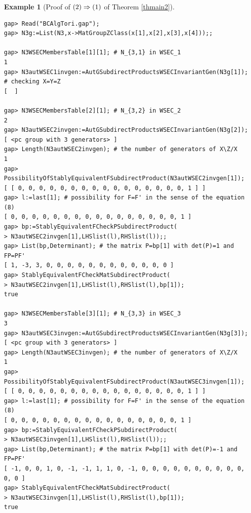 \documentclass{amsart}
\theoremstyle{plain}
\theoremstyle{definition}
\newtheorem{example}[theorem]{Example}
\theoremstyle{remark}
\newcounter{sub}\def\tr{\mbox{tr }}
\begin{document}
\bigskip
\begin{example}[Proof of ${\rm (2)}\Rightarrow {\rm (1)}$ of {Theorem \ref{thmain2}}]\label{ex9.1}~\vspace*{-5mm}\\
\begin{verbatim}
gap> Read("BCAlgTori.gap");
gap> N3g:=List(N3,x->MatGroupZClass(x[1],x[2],x[3],x[4]));;

gap> N3WSECMembersTable[1][1]; # N_{3,1} in WSEC_1
1
gap> N3autWSEC1invgen:=AutGSubdirectProductsWSECInvariantGen(N3g[1]); # checking X=Y=Z
[  ]

gap> N3WSECMembersTable[2][1]; # N_{3,2} in WSEC_2
2
gap> N3autWSEC2invgen:=AutGSubdirectProductsWSECInvariantGen(N3g[2]);
[ <pc group with 3 generators> ]
gap> Length(N3autWSEC2invgen); # the number of generators of X\Z/X
1
gap> PossibilityOfStablyEquivalentFSubdirectProduct(N3autWSEC2invgen[1]);
[ [ 0, 0, 0, 0, 0, 0, 0, 0, 0, 0, 0, 0, 0, 0, 0, 0, 1 ] ]
gap> l:=last[1]; # possibility for F=F' in the sense of the equation (8)
[ 0, 0, 0, 0, 0, 0, 0, 0, 0, 0, 0, 0, 0, 0, 0, 0, 1 ]
gap> bp:=StablyEquivalentFCheckPSubdirectProduct(
> N3autWSEC2invgen[1],LHSlist(l),RHSlist(l));;
gap> List(bp,Determinant); # the matrix P=bp[1] with det(P)=1 and FP=PF'
[ 1, -3, 3, 0, 0, 0, 0, 0, 0, 0, 0, 0, 0, 0, 0 ]
gap> StablyEquivalentFCheckMatSubdirectProduct( 
> N3autWSEC2invgen[1],LHSlist(l),RHSlist(l),bp[1]); 
true

gap> N3WSECMembersTable[3][1]; # N_{3,3} in WSEC_3
3
gap> N3autWSEC3invgen:=AutGSubdirectProductsWSECInvariantGen(N3g[3]);
[ <pc group with 3 generators> ]
gap> Length(N3autWSEC3invgen); # the number of generators of X\Z/X
1
gap> PossibilityOfStablyEquivalentFSubdirectProduct(N3autWSEC3invgen[1]);
[ [ 0, 0, 0, 0, 0, 0, 0, 0, 0, 0, 0, 0, 0, 0, 0, 0, 1 ] ]
gap> l:=last[1]; # possibility for F=F' in the sense of the equation (8)
[ 0, 0, 0, 0, 0, 0, 0, 0, 0, 0, 0, 0, 0, 0, 0, 0, 1 ]
gap> bp:=StablyEquivalentFCheckPSubdirectProduct(
> N3autWSEC3invgen[1],LHSlist(l),RHSlist(l));;
gap> List(bp,Determinant); # the matrix P=bp[1] with det(P)=-1 and FP=PF'
[ -1, 0, 0, 1, 0, -1, -1, 1, 1, 0, -1, 0, 0, 0, 0, 0, 0, 0, 0, 0, 0, 0, 0 ]
gap> StablyEquivalentFCheckMatSubdirectProduct(
> N3autWSEC3invgen[1],LHSlist(l),RHSlist(l),bp[1]);
true


\end{verbatim}
\end{example}
\end{document}
